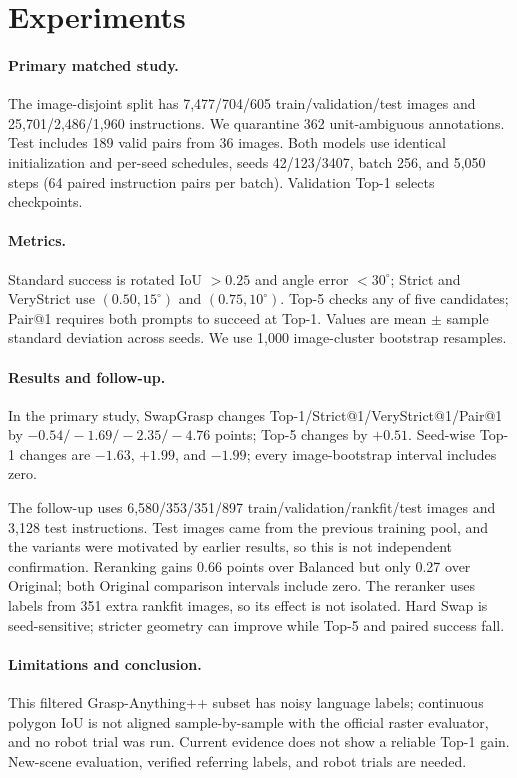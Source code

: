 \documentclass[10pt,twocolumn,letterpaper]{article}
\begin{document}
\section{Experiments}
\paragraph{Primary matched study.} The image-disjoint split has 7,477/704/605 train/validation/test images and 25,701/2,486/1,960 instructions. We quarantine 362 unit-ambiguous annotations. Test includes 189 valid pairs from 36 images. Both models use identical initialization and per-seed schedules, seeds 42/123/3407, batch 256, and 5,050 steps (64 paired instruction pairs per batch). Validation Top-1 selects checkpoints.

\paragraph{Metrics.} Standard success is rotated IoU $>0.25$ and angle error $<30^\circ$; Strict and VeryStrict use $(0.50,15^\circ)$ and $(0.75,10^\circ)$. Top-5 checks any of five candidates; Pair@1 requires both prompts to succeed at Top-1. Values are mean $\pm$ sample standard deviation across seeds. We use 1,000 image-cluster bootstrap resamples.

\paragraph{Results and follow-up.} In the primary study, SwapGrasp changes Top-1/Strict@1/VeryStrict@1/Pair@1 by $-0.54/-1.69/-2.35/-4.76$ points; Top-5 changes by $+0.51$. Seed-wise Top-1 changes are $-1.63$, $+1.99$, and $-1.99$; every image-bootstrap interval includes zero.

The follow-up uses 6,580/353/351/897 train/validation/rankfit/test images and 3,128 test instructions. Test images came from the previous training pool, and the variants were motivated by earlier results, so this is not independent confirmation. Reranking gains 0.66 points over Balanced but only 0.27 over Original; both Original comparison intervals include zero. The reranker uses labels from 351 extra rankfit images, so its effect is not isolated. Hard Swap is seed-sensitive; stricter geometry can improve while Top-5 and paired success fall.

\paragraph{Limitations and conclusion.} This filtered Grasp-Anything++ subset has noisy language labels; continuous polygon IoU is not aligned sample-by-sample with the official raster evaluator, and no robot trial was run. Current evidence does not show a reliable Top-1 gain. New-scene evaluation, verified referring labels, and robot trials are needed.

{\small
\begin{samepage}


\end{samepage}
}
\end{document}
